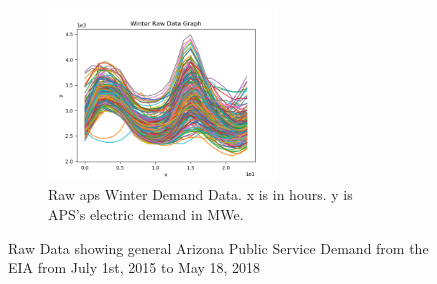 \documentclass[12pt]{UIdahoMastersThesis}
\begin{document}
\begin{figure}[t!]
\begin{subfigure}[t]{0.9\textwidth}
        \centering
        \includegraphics[height=1.8in]{Winter_Raw_Data_Graph_line.png}
        \caption{Raw \ac{aps} Winter Demand Data. x is in hours. y is APS's electric demand in MWe.}
    \end{subfigure}
        \label{RawDemand}
    \caption{Raw Data showing general Arizona Public Service Demand from the EIA from July 1st, 2015 to May 18, 2018}
\end{figure}
\end{document}
